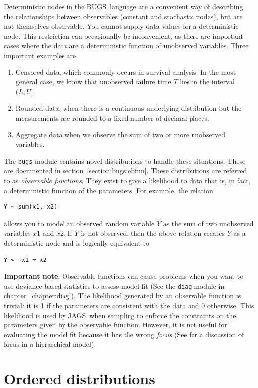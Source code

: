 \documentclass[11pt, a4paper, titlepage]{report}
\newcommand{\JAGS}{\textsf{JAGS}}
\newcommand{\BUGS}{\textsf{BUGS}}
\begin{document}
Deterministic nodes in the \BUGS\ language are a convenient way of
describing the relationships between observables (constant and
stochastic nodes), but are not themselves observable. You cannot
supply data values for a deterministic node.  This restriction can
occasionally be inconvenient, as there are important cases where the
data are a deterministic function of unobserved variables.  Three
important examples are
\begin{enumerate}
\item Censored data, which commonly occurs in survival analysis. In
the most general case, we know that unobserved failure time $T$
lies in the interval $(L,U]$.
\item Rounded data, when there is a continuous underlying distribution
but the measurements are rounded to a fixed number of decimal places.
\item Aggregate data when we observe the sum of two or more
unobserved variables.
\end{enumerate}
The \texttt{bugs} module contains novel distributions to handle these
situations. These are documented in section~\ref{section:bugs:obfun}.
These distributions are referred to as {\em observable
  functions}. They exist to give a likelihood to data that is, in
fact, a deterministic function of the parameters.  For example, the
relation
\begin{verbatim}
Y ~ sum(x1, x2)
\end{verbatim}
allows you to model an observed random variable $Y$ as the sum of two
unobserved variables $x1$ and $x2$. If $Y$ is not observed, then the
above relation creates $Y$ as a deterministic node and is logically
equivalent to
\begin{verbatim}
Y <- x1 + x2
\end{verbatim}

{\bf Important note}: Observable functions can cause problems when you
want to use deviance-based statistics to assess model fit (See the
\texttt{diag} module in chapter~\ref{chapter:diag}). The likelihood
generated by an observable function is trivial: it is 1 if the
parameters are consistent with the data and 0 otherwise. This
likelihood is used by \JAGS\ when sampling to enforce the constraints
on the parameters given by the observable function. However, it is not
useful for evaluating the model fit because it has the wrong {\em
  focus} (See \citet{spiegelhalter:etal:2002} for a discussion of
focus in a hierarchical model).

\section{Ordered distributions}
\end{document}
